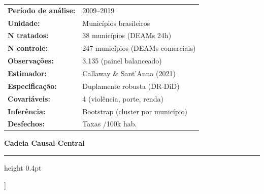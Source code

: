 \documentclass[twocolumn, 10pt]{article}
\begin{document}
{\begin{@twocolumnfalse}
\begin{minipage}[t]{0.48\textwidth}
    \vspace{4pt}
    \small
    \begin{tabular}{@{}ll}
      \textbf{Período de análise:} & 2009--2019 \\
      \textbf{Unidade:}            & Municípios brasileiros \\
      \textbf{N tratados:}         & 38 municípios (DEAMs 24h) \\
      \textbf{N controle:}         & 247 municípios (DEAMs comerciais) \\
      \textbf{Observações:}        & 3.135 (painel balanceado) \\
      \textbf{Estimador:}          & Callaway \& Sant'Anna (2021) \\
      \textbf{Especificação:}      & Duplamente robusta (DR-DiD) \\
      \textbf{Covariáveis:}        & 4 (violência, porte, renda) \\
      \textbf{Inferência:}         & Bootstrap (cluster por município) \\
      \textbf{Desfechos:}          & Taxas /100k hab. \\
    \end{tabular}

    \vspace{8pt}
    {\sffamily\bfseries\small Cadeia Causal Central}

    \vspace{4pt}
    \small
    \begin{center}
    \end{center}
  \end{minipage}

  \vspace{0.8cm}
  \hrule height 0.4pt
  \vspace{0.6cm}

\end{@twocolumnfalse}
}]
\end{document}
